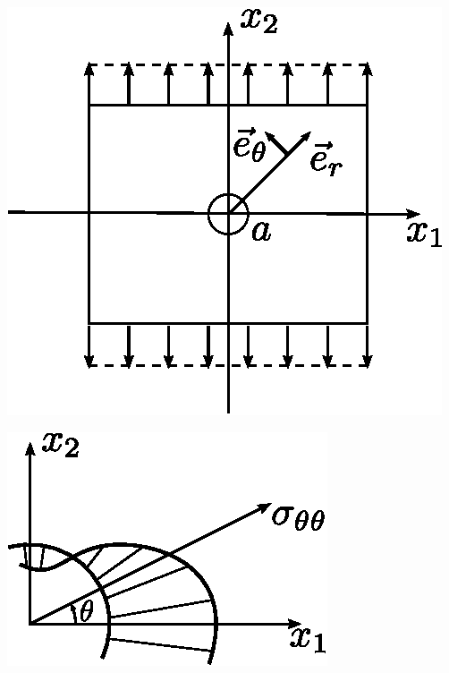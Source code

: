 \begin{multicols}{2}
    \begin{center}
        \includegraphics{../images/T1_Ch08-03a}
    \end{center}
    \columnbreak
    \begin{center}
        \includegraphics{../images/T1_Ch08-03b}
    \end{center}
\end{multicols}

